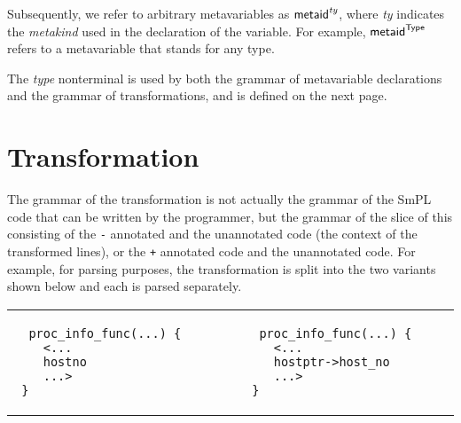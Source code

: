 \documentclass{article}
\newcommand{\sizecodebis}[0]{\scriptsize}
\newcommand{\msf}[1]{\mbox{\sf{{#1}}}}
\newcommand{\ssf}[1]{\mbox{\scriptsize\sf{{#1}}}}
\newcommand{\mth}[1]{\({#1}\)}
\newcommand{\ttlb}{\mbox{\tt \char'173}}
\newcommand{\ttrb}{\mbox{\tt \char'175}}
\begin{document}
\begin{grammar}

  

  \CASE{\ttlb~\ANY{\NT{type} ,} \NT{type} \ttrb}


\end{grammar}


Subsequently, we refer to arbitrary metavariables as
\mth{\msf{metaid}^{\mbox{\scriptsize{\it{ty}}}}}, where {\it{ty}} indicates
the {\it metakind} used in the declaration of the variable.  For example,
\mth{\msf{metaid}^{\ssf{Type}}} refers to a metavariable that stands for
any type.

The {\it type} nonterminal is used by both the grammar of metavariable
declarations and the grammar of transformations, and is defined on the next
page.

\section{Transformation}

The grammar of the transformation is not actually the grammar of the SmPL
code that can be written by the programmer, but the grammar of the slice of
this consisting of the {\tt -} annotated and the unannotated code (the
context of the transformed lines), or the {\tt +} annotated code and the
unannotated code.  For example, for parsing purposes, the transformation
is split into the two variants shown below and each is parsed
separately.


{%
\begin{center}
\begin{tabular}{p{3cm}p{5cm}p{3cm}}
\begin{verbatim}
  proc_info_func(...) {        
    <...
    hostno
    ...>
 }
\end{verbatim}
&&
\begin{verbatim}
  proc_info_func(...) {        
    <...
    hostptr->host_no
    ...>
 }
\end{verbatim}
\end{tabular}
\end{center}
}
\end{document}
